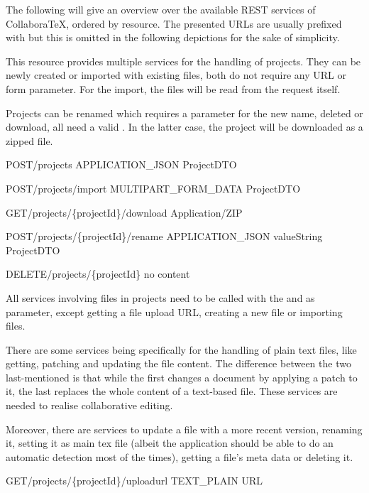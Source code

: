 The following will give an overview over the available REST services of CollaboraTeX, ordered by resource. The presented URLs are usually prefixed with  but this is omitted in the following depictions for the sake of simplicity.


This resource provides multiple services for the handling of projects. They can be newly created or imported with existing files, both do not require any URL or form parameter. For the import, the files will be read from the request itself.

Projects can be renamed which requires a parameter  for the new name, deleted or download, all need a valid . In the latter case, the project will be downloaded as a zipped file.

{POST}{/projects}
{}{APPLICATION\_JSON}
{ProjectDTO}

{POST}{/projects/import}
{MULTIPART\_FORM\_DATA}{}
{ProjectDTO}

{GET}{/projects/\{projectId\}/download}
{}{}
{Application/ZIP}

{POST}{/projects/\{projectId\}/rename}
{}{APPLICATION\_JSON}
{value}{String}
{ProjectDTO}

{DELETE}{/projects/\{projectId\}}
{}{}
{no content}


All services involving files in projects need to be called with the  and  as parameter, except getting a file upload URL, creating a new file or importing files.

There are some services being specifically for the handling of plain text files, like getting, patching and updating the file content. The difference between the two last-mentioned is that while the first changes a document by applying a patch to it, the last replaces the whole content of a text-based file. These services are needed to realise collaborative editing.

Moreover, there are services to update a file with a more recent version, renaming it, setting it as main tex file (albeit the application should be able to do an automatic detection most of the times), getting a file's meta data or deleting it.

{GET}{/projects/\{projectId\}/uploadurl}
{}{TEXT\_PLAIN}
{URL}

